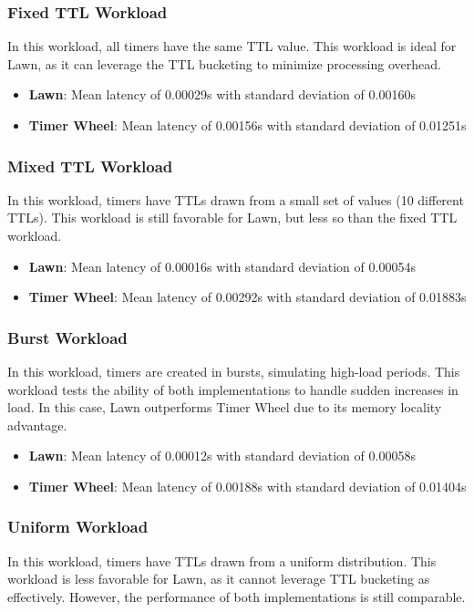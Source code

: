 \documentclass[conference]{IEEEtran}
\begin{document}
\subsubsection{Fixed TTL Workload}
In this workload, all timers have the same TTL value. This workload is ideal for Lawn, as it can leverage the TTL bucketing to minimize processing overhead.

\begin{itemize}
    \item \textbf{Lawn}: Mean latency of 0.00029s with standard deviation of 0.00160s
    \item \textbf{Timer Wheel}: Mean latency of 0.00156s with standard deviation of 0.01251s
\end{itemize}

\subsubsection{Mixed TTL Workload}
In this workload, timers have TTLs drawn from a small set of values (10 different TTLs). This workload is still favorable for Lawn, but less so than the fixed TTL workload.

\begin{itemize}
    \item \textbf{Lawn}: Mean latency of 0.00016s with standard deviation of 0.00054s
    \item \textbf{Timer Wheel}: Mean latency of 0.00292s with standard deviation of 0.01883s
\end{itemize}

\subsubsection{Burst Workload}
In this workload, timers are created in bursts, simulating high-load periods. This workload tests the ability of both implementations to handle sudden increases in load. In this case, Lawn outperforms Timer Wheel due to its memory locality advantage.

\begin{itemize}
    \item \textbf{Lawn}: Mean latency of 0.00012s with standard deviation of 0.00058s
    \item \textbf{Timer Wheel}: Mean latency of 0.00188s with standard deviation of 0.01404s
\end{itemize}

\subsubsection{Uniform Workload}
In this workload, timers have TTLs drawn from a uniform distribution. This workload is less favorable for Lawn, as it cannot leverage TTL bucketing as effectively. However, the performance of both implementations is still comparable.
\end{document}
